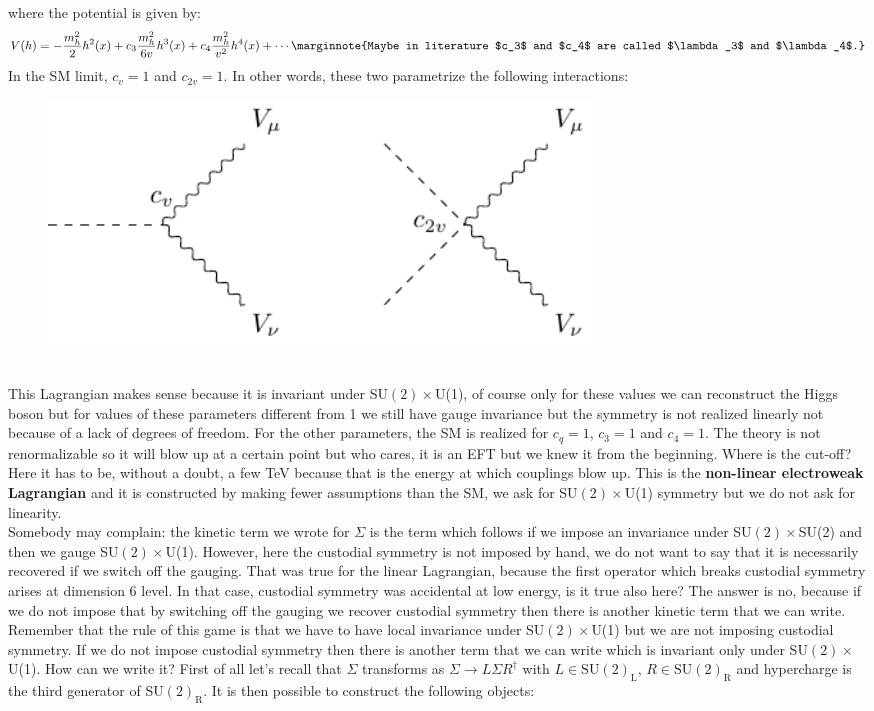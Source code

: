 \documentclass[../main.tex]{subfiles}
\begin{document}
where the potential is given by:
\[
V(h)=-\frac{m_h^2}{2}h^2(x)+c_3\frac{m_h^2}{6v}h^3(x)+c_4\frac{m_h^2}{v^2}h^4(x)+\cdots\marginnote{Maybe in literature $c_3$ and $c_4$ are called $\lambda_3$ and $\lambda_4$.}
\]
In the SM limit, $c_v=1$ and $c_{2v}=1$. In other words, these two parametrize the following interactions:
\begin{figure}[h]
    \centering
    \includegraphics[width=0.7\textwidth]{Images/cvc2v.pdf}
    \caption*{}
\end{figure}\\
This Lagrangian makes sense because it is invariant under SU$(2)\times$U(1), of course only for these values we can reconstruct the Higgs boson but for values of these parameters different from 1 we still have gauge invariance but the symmetry is not realized linearly not because of a lack of degrees of freedom. For the other parameters, the SM is realized for $c_q=1$, $c_3=1$ and $c_4=1$. The theory is not renormalizable so it will blow up at a certain point but who cares, it is an EFT but we knew it from the beginning. Where is the cut-off? Here it has to be, without a doubt, a few TeV because that is the energy at which couplings blow up. This is the \textbf{non-linear electroweak Lagrangian} and it is constructed by making fewer assumptions than the SM, we ask for SU$(2)\times$U(1) symmetry but we do not ask for linearity.\\
Somebody may complain: the kinetic term we wrote for $\Sigma$ is the term which follows if we impose an invariance under SU$(2)\times$SU(2) and then we gauge SU$(2)\times$U(1). However, here the custodial symmetry is not imposed by hand, we do not want to say that it is necessarily recovered if we switch off the gauging. That was true for the linear Lagrangian, because the first operator which breaks custodial symmetry arises at dimension 6 level. In that case, custodial symmetry was accidental at low energy, is it true also here? The answer is no, because if we do not impose that by switching off the gauging we recover custodial symmetry then there is another kinetic term that we can write. Remember that the rule of this game is that we have to have local invariance under SU$(2)\times$U(1) but we are not imposing custodial symmetry. If we do not impose custodial symmetry then there is another term that we can write which is invariant only under SU$(2)\times$U(1). How can we write it? First of all let's recall that $\Sigma$ transforms as $\Sigma\to L\Sigma R^\dagger$ with $L\in\text{SU}(2)_{\text{L}}$, $R\in\text{SU}(2)_{\text{R}}$ and hypercharge is the third generator of SU$(2)_{\text{R}}$. It is then possible to construct the following objects:
\end{document}
